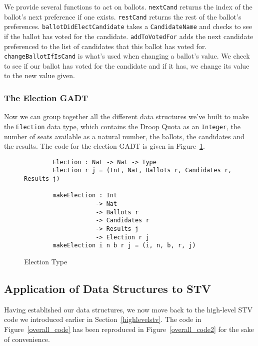 We provide several functions to act on ballots. \texttt{nextCand} returns the
index of the ballot's next preference if one exists. \texttt{restCand} returns
the rest of the ballot's preferences. \texttt{ballotDidElectCandidate} takes a
\texttt{CandidateName} and checks to see if the ballot has voted for the
candidate. \texttt{addToVotedFor} adds the next candidate preferenced to the
list of candidates that this ballot has voted for. \texttt{changeBallotIfIsCand}
is what's used when changing a ballot's value. We check to see if our ballot has
voted for the candidate and if it has, we change its value to the new value
given. 

\subsubsection{The Election GADT}

Now we can group together all the different data structures we've built to make
the \texttt{Election} data type, which contains the Droop Quota as an
\texttt{Integer}, the number of seats available as a natural number, the
ballots, the candidates and the results. The code for the election GADT is given
in Figure~\ref{election_type_code}. 

\begin{figure}[ht!!!!!!!!!!!!!!]
	\caption{Election Type}
	\label{election_type_code}
	\begin{lstlisting}
        Election : Nat -> Nat -> Type
        Election r j = (Int, Nat, Ballots r, Candidates r, Results j)

        makeElection : Int 
                    -> Nat 
                    -> Ballots r
                    -> Candidates r 
                    -> Results j 
                    -> Election r j
        makeElection i n b r j = (i, n, b, r, j)
    \end{lstlisting}
\end{figure}

\newpage

\subsection{Application of Data Structures to STV}

Having established our data structures, we now move back to the high-level STV
code we introduced earlier in Section~\ref{highlevelstv}. The code in
Figure~\ref{overall_code} has been reproduced in Figure~\ref{overall_code2} for
the sake of convenience.

